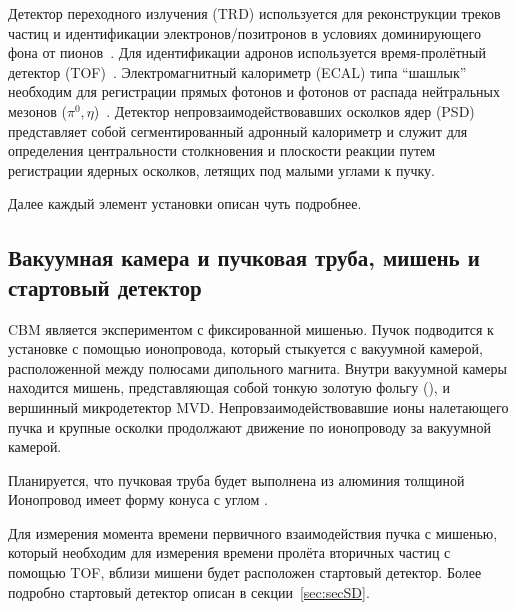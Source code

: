 Детектор переходного излучения (TRD) используется для реконструкции треков частиц и идентификации электронов/позитронов в условиях доминирующего фона от пионов~\cite{TRD}. Для идентификации адронов используется время-пролётный детектор (TOF)~\cite{TDR_TOF}. Электромагнитный калориметр (ECAL) типа ``шашлык'' необходим для регистрации прямых фотонов и фотонов от распада нейтральных мезонов ($ \pi^{0}, \eta $)~\cite{ECAL_KOROLKO}. Детектор непровзаимодействовавших осколков ядер (PSD)~\cite{TDR_PSD} представляет собой сегментированный адронный калориметр и служит для определения центральности столкновения и плоскости реакции путем регистрации ядерных осколков, летящих под малыми углами к пучку.

Далее каждый элемент установки описан чуть подробнее.


\subsection{Вакуумная камера и пучковая труба, мишень и стартовый детектор}\label{sec:secVacChamberPipe}

CBM является экспериментом с фиксированной мишенью. Пучок подводится к установке с помощью ионопровода, который стыкуется с вакуумной камерой, расположенной между полюсами дипольного магнита. Внутри вакуумной камеры находится мишень, представляющая собой тонкую золотую фольгу (\todo), и вершинный микродетектор MVD. Непровзаимодействовавшие ионы налетающего пучка и крупные осколки продолжают движение по ионопроводу за вакуумной камерой.

Планируется, что пучковая труба будет выполнена из алюминия толщиной \todo
Ионопровод имеет форму конуса с углом \todo.

Для измерения момента времени первичного взаимодействия пучка с мишенью, который необходим для измерения времени пролёта вторичных частиц с помощью TOF, вблизи мишени будет расположен стартовый детектор. \todo
Более подробно стартовый детектор описан в секции~\ref{sec:secSD}.


